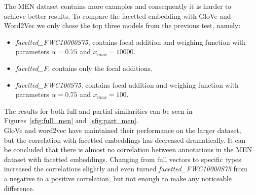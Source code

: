 \noindent
The MEN dataset contains more examples and consequently it is harder to achieve better results. To compare the facetted embedding with GloVe and Word2Vec we only chose the top three models from the previous test, namely:
\begin{itemize}
\item \emph{facetted\_FWC10000S75}, contains focal addition and weighing function with parameters $\alpha=0.75$ and $x_{max}=10000$.
\item  \emph{facetted\_F}, contains only the focal additions.
\item \emph{facetted\_FWC100S75}, contains focal addition and weighing function with parameters $\alpha=0.75$ and $x_{max}=100$.
\end{itemize} 
The results for both full and partial similarities can be seen in Figures~\ref{sfig:full_men} and~\ref{sfig:part_men}. \\
GloVe and word2vec have maintained their performance on the larger dataset, but the correlation with facetted embeddings has decreased dramatically. It can be concluded that there is almost no correlation between annotations in the MEN dataset with facetted embeddings. Changing from full vectors to specific types increased the correlations slightly and even turned \emph{facetted\_FWC10000S75} from a negative to a positive correlation, but not enough to make any noticeable difference.

